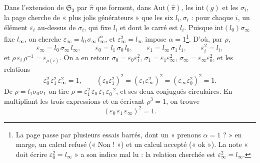 \documentclass[11pt,a4paper]{article}
\begin{document}
Dans l'extension de $\mathfrak{S}_3$ par $\widehat{\pi}$ que forment, dans
$\mathrm{Aut}(\widehat{\pi})$, les $\mathrm{int}(g)$ et les $\sigma_i$, la page
cherche de « plus jolis générateurs » que les six $l_i, \sigma_i$ : pour chaque
$i$, un élément $\varepsilon_i$ au-dessus de $\sigma_i$, qui fixe $l_i$ et dont le
carré est $l_i$. Puisque $\mathrm{int}(l_0)\sigma_\infty$ fixe $l_\infty$, on
cherche $\varepsilon_\infty = l_0\,\sigma_\infty\, l_\infty^{\alpha}$, et
$\varepsilon_\infty^2 = l_\infty$ impose $\alpha = 1$\footnote{La page passe par
plusieurs essais barrés, dont un « prenons $\alpha = 1$ ? » en marge, un calcul
refusé (« Non ! ») et un calcul accepté (« ok »). La note « doit écrire
$\varepsilon_0^2 = l_\infty$ » a son indice mal lu : la relation cherchée est
$\varepsilon_\infty^2 = l_\infty$.}. D'où, par $\rho$,
\[
\varepsilon_\infty = l_0\,\sigma_\infty\, l_\infty, \qquad
\varepsilon_0 = l_1\,\sigma_0\, l_0, \qquad
\varepsilon_1 = l_\infty\,\sigma_1\, l_1, \qquad \varepsilon_i^2 = l_i,
\]
et $\rho\,\varepsilon_i\,\rho^{-1} = \varepsilon_{\rho(i)}$. On a en retour
$\sigma_0 = \varepsilon_0 \varepsilon_1^2$, $\sigma_1 = \varepsilon_1
\varepsilon_\infty^2$, $\sigma_\infty = \varepsilon_\infty \varepsilon_0^2$, et
les relations
\[
\varepsilon_0^2\,\varepsilon_1^2\,\varepsilon_\infty^2 = 1, \qquad
(\varepsilon_0\varepsilon_1^2)^2 = (\varepsilon_1\varepsilon_\infty^2)^2 =
(\varepsilon_\infty\varepsilon_0^2)^2 = 1 .
\]
De $\rho = l_1\sigma_0\sigma_1$ on tire $\rho = \varepsilon_1^2\,\varepsilon_0\,
\varepsilon_1\, \varepsilon_0^{-2}$, et ses deux conjugués circulaires. En
multipliant les trois expressions et en écrivant $\rho^3 = 1$, on trouve
\[
(\varepsilon_0\,\varepsilon_1\,\varepsilon_\infty)^2 = 1 .
\]
\end{document}
